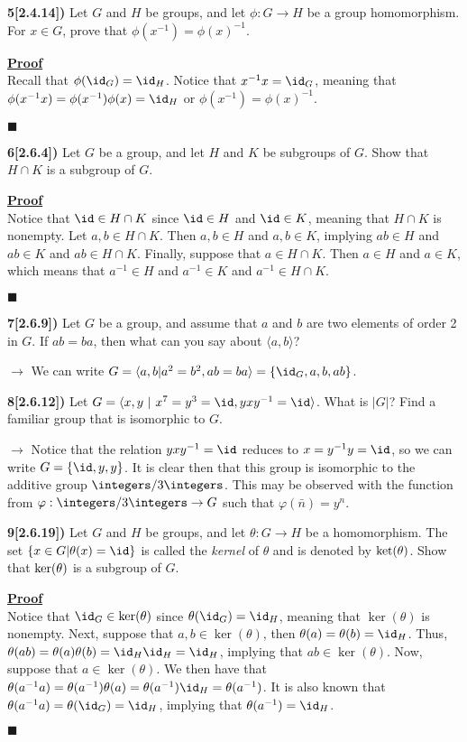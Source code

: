 \documentclass[12pt,a4paper]{article}
\newcommand{\prob}[2]{\textbf{#1)} #2}
\newenvironment{proof}
{
\textbf{\underline{Proof}} \\
}
{
\begin{flushright}
$\blacksquare$
\end{flushright}}
\begin{document}
\prob{5[2.4.14]}{Let $G$ and $H$ be groups, and let $\phi: G \rightarrow H$ be a group homomorphism. For $x \in G$, prove that $\phi(x^{-1}) = \phi(x)^{-1}$.}

\begin{proof}
Recall that $\phi(\id_G) = \id_H$. Notice that $x^{-1}x = \id_G$, meaning that $\phi(x^{-1}x) = \phi(x^{-1})\phi(x) = \id_H$ or $\phi(x^{-1}) = \phi(x)^{-1}$.
\end{proof}

\prob{6[2.6.4]}{Let $G$ be a group, and let $H$ and $K$ be subgroups of $G$. Show that $H \cap K$ is a subgroup of $G$.}

\begin{proof}
Notice that $\id \in H \cap K$ since $\id \in H$ and $\id \in K$, meaning that $H \cap K$ is nonempty. Let $a,b \in H \cap K$. Then $a,b \in H$ and $a,b \in K$, implying $ab \in H$ and $ab \in K$ and $ab \in H \cap K$. Finally, suppose that $a \in H \cap K$. Then $a \in H$ and $a \in K$, which means that $a^{-1} \in H$ and $a^{-1} \in K$ and $a^{-1} \in H \cap K$.
\end{proof}

\prob{7[2.6.9]}{Let $G$ be a group, and assume that $a$ and $b$ are two elements of order 2 in $G$. If $ab = ba$, then what can you say about $\langle a,b \rangle$?}

$\rightarrow$ We can write $G = \langle a,b | a^2=b^2, ab = ba \rangle = \{\id_G,a,b,ab\}$.

\prob{8[2.6.12]}{Let $G = \langle x,y ~|~ x^{7}=y^{3}=\id,yxy^{-1}=\id \rangle$. What is $|G|$? Find a familiar group that is isomorphic to $G$.}

$\rightarrow$ Notice that the relation $yxy^{-1} = \id$ reduces to $x = y^{-1}y = \id$, so we can write $G = \{\id,y,y\}$. It is clear then that this group is isomorphic to the additive group $\integers/3\integers$. This may be observed with the function from $\varphi: \integers/3\integers \rightarrow G$ such that $\varphi(\bar{n}) = y^{n}$.

\prob{9[2.6.19]}{Let $G$ and $H$ be groups, and let $\theta: G \rightarrow H$ be a homomorphism. The set $\{x \in G | \theta(x)=\id \}$ is called the \textit{kernel} of $\theta$ and is denoted by ${\rm ket}(\theta)$. Show that ${\rm ker}(\theta)$ is a subgroup of $G$.}

\begin{proof}
Notice that $\id_G \in \ker(\theta)$ since $\theta(\id_G) = \id_H$, meaning that $\ker(\theta)$ is nonempty. Next, suppose that $a,b \in \ker(\theta)$, then $\theta(a) = \theta(b) = \id_H$. Thus, $\theta(ab) = \theta(a)\theta(b) = \id_H\id_H = \id_H$, implying that $ab \in \ker(\theta)$. Now, suppose that $a \in \ker(\theta)$. We then have that $\theta(a^{-1}a) = \theta(a^{-1})\theta(a) = \theta(a^{-1})\id_H = \theta(a^{-1})$. It is also known that $\theta(a^{-1}a) = \theta(\id_G) = \id_H$, implying that $\theta(a^{-1}) = \id_H$.
\end{proof}
\end{document}
